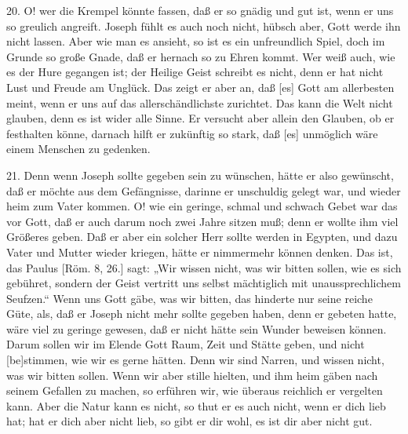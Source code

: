 20. O! wer die Krempel könnte fassen, daß er so gnädig und gut ist, wenn er uns so greulich angreift. Joseph fühlt es auch noch nicht, hübsch aber, Gott werde ihn nicht lassen. Aber wie man es ansieht, so ist es ein unfreundlich Spiel, doch im Grunde so große Gnade, daß er hernach so zu Ehren kommt. Wer weiß auch, wie es der Hure gegangen ist; der Heilige Geist schreibt es nicht, denn er hat nicht Lust und Freude am Unglück. Das zeigt er aber an, daß [es] Gott am allerbesten meint, wenn er uns auf das allerschändlichste zurichtet. Das kann die Welt nicht glauben, denn es ist wider alle
Sinne. Er versucht aber allein den Glauben, ob er festhalten könne, darnach hilft er zukünftig so stark, daß [es] unmöglich wäre einem Menschen zu gedenken.

21. Denn wenn Joseph sollte gegeben sein zu wünschen, hätte er also gewünscht, daß er möchte aus dem Gefängnisse, darinne er unschuldig gelegt war, und wieder heim zum Vater kommen. O! wie ein geringe, schmal und schwach Gebet war das vor Gott, daß er auch darum noch zwei Jahre sitzen muß; denn er wollte ihm viel Größeres geben. Daß er aber ein solcher Herr sollte werden in Egypten, und dazu Vater und Mutter wieder kriegen, hätte er nimmermehr können denken. Das ist, das Paulus [Röm. 8, 26.] sagt: „Wir wissen nicht, was wir bitten sollen, wie es sich gebühret, sondern der Geist vertritt uns selbst mächtiglich mit unaussprechlichem Seufzen.“ Wenn uns Gott gäbe, was wir bitten, das hinderte nur seine reiche Güte, als, daß er Joseph nicht mehr sollte gegeben haben, denn er gebeten hatte, wäre viel zu geringe gewesen, daß er nicht hätte sein Wunder beweisen können. Darum sollen wir im Elende Gott Raum, Zeit und Stätte geben, und nicht [be]stimmen, wie wir es gerne hätten. Denn wir sind Narren, und wissen nicht, was wir bitten sollen. Wenn wir aber stille hielten, und ihm heim gäben nach seinem Gefallen zu machen, so erführen wir, wie überaus reichlich er vergelten kann. Aber die Natur kann es nicht, so thut er es auch nicht, wenn er dich lieb hat; hat er dich aber nicht lieb, so gibt er dir wohl, es ist dir aber nicht gut.

